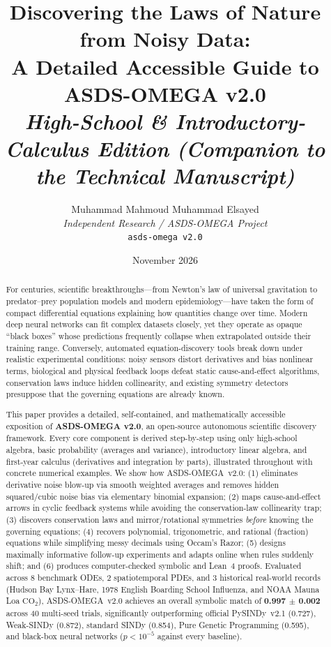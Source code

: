 \documentclass[11pt,a4paper]{article}
\title{\textbf{Discovering the Laws of Nature from Noisy Data:\\
A Detailed Accessible Guide to ASDS-OMEGA v2.0}\\[0.4em]
\large\textit{High-School \& Introductory-Calculus Edition (Companion to the Technical Manuscript)}}
\author{
  Muhammad Mahmoud Muhammad Elsayed\\
  \textit{Independent Research / ASDS-OMEGA Project}\\
  \texttt{asds-omega v2.0}
}
\date{November 2026}
\begin{document}
\maketitle

\begin{abstract}
For centuries, scientific breakthroughs—from Newton's law of universal gravitation to predator--prey population models and modern epidemiology—have taken the form of compact differential equations explaining how quantities change over time. Modern deep neural networks can fit complex datasets closely, yet they operate as opaque ``black boxes'' whose predictions frequently collapse when extrapolated outside their training range. Conversely, automated equation-discovery tools break down under realistic experimental conditions: noisy sensors distort derivatives and bias nonlinear terms, biological and physical feedback loops defeat static cause-and-effect algorithms, conservation laws induce hidden collinearity, and existing symmetry detectors presuppose that the governing equations are already known.

This paper provides a detailed, self-contained, and mathematically accessible exposition of \textbf{ASDS-OMEGA v2.0}, an open-source autonomous scientific discovery framework. Every core component is derived step-by-step using only high-school algebra, basic probability (averages and variance), introductory linear algebra, and first-year calculus (derivatives and integration by parts), illustrated throughout with concrete numerical examples. We show how ASDS-OMEGA~v2.0: (1) eliminates derivative noise blow-up via smooth weighted averages and removes hidden squared/cubic noise bias via elementary binomial expansion; (2) maps cause-and-effect arrows in cyclic feedback systems while avoiding the conservation-law collinearity trap; (3) discovers conservation laws and mirror/rotational symmetries \emph{before} knowing the governing equations; (4) recovers polynomial, trigonometric, and rational (fraction) equations while simplifying messy decimals using Occam's Razor; (5) designs maximally informative follow-up experiments and adapts online when rules suddenly shift; and (6) produces computer-checked symbolic and Lean~4 proofs. Evaluated across 8 benchmark ODEs, 2 spatiotemporal PDEs, and 3 historical real-world records (Hudson Bay Lynx--Hare, 1978 English Boarding School Influenza, and NOAA Mauna Loa $\text{CO}_2$), ASDS-OMEGA~v2.0 achieves an overall symbolic match of \textbf{0.997 $\pm$ 0.002} across 40 multi-seed trials, significantly outperforming official PySINDy~v2.1 (0.727), Weak-SINDy (0.872), standard SINDy (0.854), Pure Genetic Programming (0.595), and black-box neural networks ($p < 10^{-5}$ against every baseline).
\end{abstract}
\end{document}
